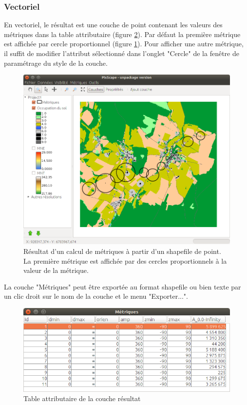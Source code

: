 \documentclass{report}
\begin{document}
\subsubsection{Vectoriel}

En vectoriel, le résultat est une couche de point contenant les valeurs des métriques dans la table attributaire (figure \ref{metric_result_attr}). Par défaut la première métrique est affichée par cercle proportionnel (figure \ref{metric_result_vect}). Pour afficher une autre métrique, il suffit de modifier l'attribut sélectionné dans l'onglet "Cercle" de la fenêtre de paramétrage du style de la couche.

\begin{figure}[H]
	\includegraphics[scale=0.5]{img/metric_result_vect-fr.png} 
	\caption{Résultat d'un calcul de métriques à partir d'un shapefile de point. La première métrique est affichée par des cercles proportionnels à la valeur de la métrique.}
	\label{metric_result_vect}
\end{figure}

La couche "Métriques" peut être exportée au format shapefile ou bien texte par un clic droit sur le nom de la couche et le menu "Exporter...".

\begin{figure}[H]
	\includegraphics[scale=0.5]{img/metric_result_attr-fr.png} 
	\caption{Table attributaire de la couche résultat}
	\label{metric_result_attr}
\end{figure}
\end{document}
